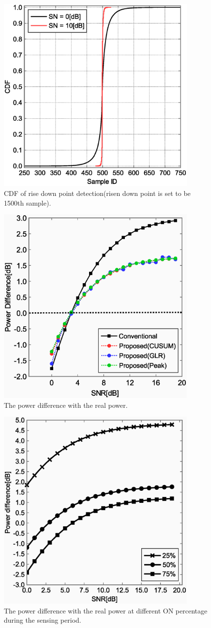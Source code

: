 \begin{figure}[!htp]
\centering
\includegraphics[width=100mm]{cdf_ON2OFF.eps}
\caption{CDF of rise down point detection(risen down point is set to be 1500th sample).}
\label{cdf_on2off}
\end{figure}

\begin{figure}[!htp]
\centering
\includegraphics[width=100mm]{peak.eps}
\caption{The power difference with the real power.}
\label{Powdiff}
\end{figure}

\begin{figure}[!htp]
\centering
\includegraphics[width=100mm]{per.eps}
\caption{The power difference with the real power at different ON percentage during the sensing period.}
\label{per}
\end{figure}
